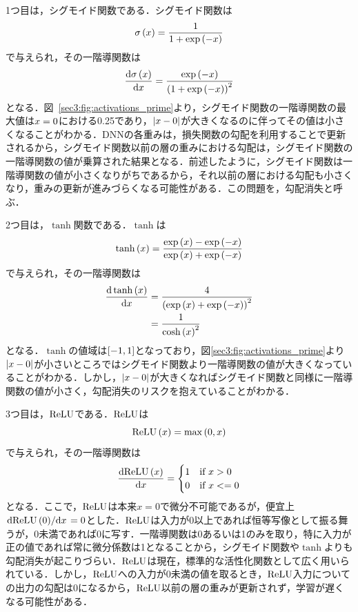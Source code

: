 1つ目は，シグモイド関数である．シグモイド関数は
\begin{equation}
    \sigma\left(x\right) = \frac{1}{1 + \exp\left(-x\right)}
\end{equation}
で与えられ，その一階導関数は
\begin{equation}
    \dv{\sigma\left(x\right)}{x} = \frac{\exp\left(-x\right)}{\left(1 + \exp\left(-x\right)\right)^{2}}
\end{equation}
となる．図~\ref{sec3:fig:activations_prime}より，シグモイド関数の一階導関数の最大値は$x=0$における0.25であり，$\left|x - 0\right|$が大きくなるのに伴ってその値は小さくなることがわかる．DNNの各重みは，損失関数の勾配を利用することで更新されるから，シグモイド関数以前の層の重みにおける勾配は，シグモイド関数の一階導関数の値が乗算された結果となる．前述したように，シグモイド関数は一階導関数の値が小さくなりがちであるから，それ以前の層における勾配も小さくなり，重みの更新が進みづらくなる可能性がある．この問題を，勾配消失と呼ぶ．

2つ目は，$\tanh$関数である．$\tanh$は
\begin{equation}
    \tanh\left(x\right) = \frac{\exp\left(x\right) - \exp\left(-x\right)}{\exp\left(x\right) + \exp\left(-x\right)}
\end{equation}
で与えられ，その一階導関数は
\begin{align}
    \dv{\tanh\left(x\right)}{x} & = \frac{4}{\left(\exp\left(x\right) + \exp\left(-x\right)\right)^{2}} \\
                                  & = \frac{1}{\cosh\left(x\right)^{2}}
\end{align}
となる．$\tanh$の値域は$\left[-1, 1\right]$となっており，図\ref{sec3:fig:activations_prime}より$\left|x - 0\right|$が小さいところではシグモイド関数より一階導関数の値が大きくなっていることがわかる．しかし，$\left|x - 0\right|$が大きくなればシグモイド関数と同様に一階導関数の値が小さく，勾配消失のリスクを抱えていることがわかる．

3つ目は，$\text{ReLU}$である．$\text{ReLU}$は
\begin{equation}
    \text{ReLU}\left(x\right) = \max \left(0, x\right)
\end{equation}
で与えられ，その一階導関数は
\begin{equation}
    \dv{\text{ReLU}\left(x\right)}{x} =
    \begin{cases}
        1 & \text{if $x > 0$}  \\
        0 & \text{if $x <= 0$}
    \end{cases}
\end{equation}
となる．ここで，$\text{ReLU}$は本来$x = 0$で微分不可能であるが，便宜上$\dv*{\text{ReLU}\left(0\right)}{x} = 0$とした．$\text{ReLU}$は入力が0以上であれば恒等写像として振る舞うが，0未満であれば0に写す．一階導関数は0あるいは1のみを取り，特に入力が正の値であれば常に微分係数は1となることから，シグモイド関数や$\tanh$よりも勾配消失が起こりづらい．$\text{ReLU}$は現在，標準的な活性化関数として広く用いられている．しかし，$\text{ReLU}$への入力が0未満の値を取るとき，$\text{ReLU}$入力についての出力の勾配は0になるから，$\text{ReLU}$以前の層の重みが更新されず，学習が遅くなる可能性がある．

